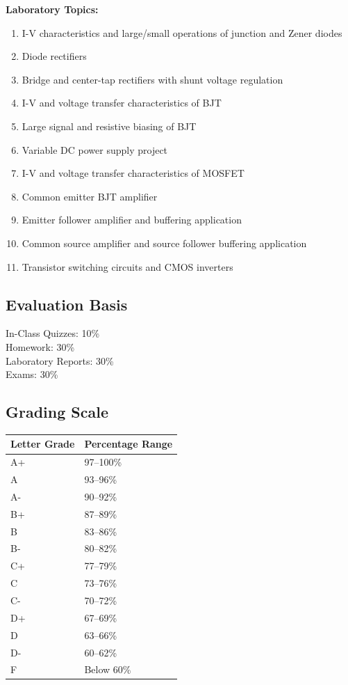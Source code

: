 \documentclass[10pt]{article}
\begin{document}
\textbf{Laboratory Topics: }
\begin{enumerate}
    \item I-V characteristics and large/small operations of junction and Zener diodes
    \item Diode rectifiers
    \item Bridge and center-tap rectifiers with shunt voltage regulation
    \item I-V and voltage transfer characteristics of BJT
    \item Large signal and resistive biasing of BJT
    \item Variable DC power supply project
    \item I-V and voltage transfer characteristics of MOSFET
    \item Common emitter BJT amplifier
    \item Emitter follower amplifier and buffering application
    \item Common source amplifier and source follower buffering application
    \item Transistor switching circuits and CMOS inverters
\end{enumerate}

\subsection*{Evaluation Basis}
In-Class Quizzes:  10\% \\
Homework: 30\% \\
Laboratory Reports: 30\% \\
Exams: 30\% 

\subsection*{Grading Scale}
\begin{center}
\begin{tabular}{ll}
\textbf{Letter Grade} & \textbf{Percentage Range} \\
\hline
A+ & 97--100\% \\
A & 93--96\% \\
A- & 90--92\% \\
B+ & 87--89\% \\
B & 83--86\% \\
B- & 80--82\% \\
C+ & 77--79\% \\
C & 73--76\% \\
C- & 70--72\% \\
D+ & 67--69\% \\
D & 63--66\% \\
D- & 60--62\% \\
F & Below 60\% \\
\end{tabular}
\end{center}
\end{document}
